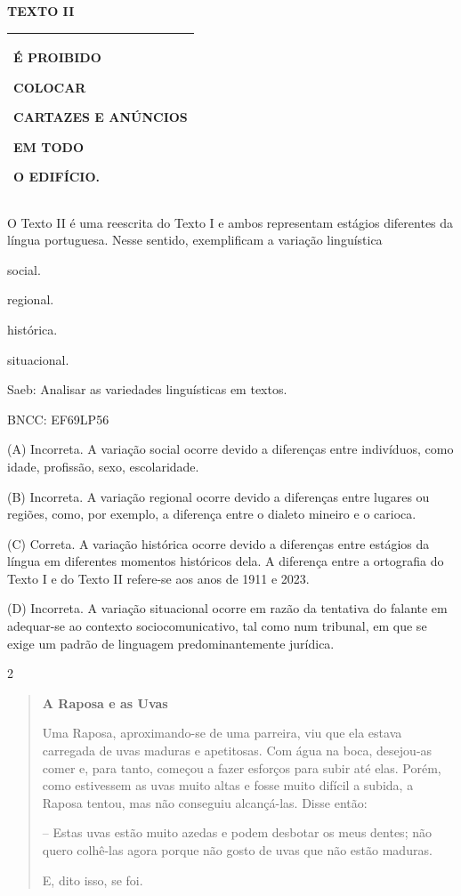 
\textbf{TEXTO II}

\begin{longtable}[]{@{}l@{}}
\toprule
\endhead
\begin{minipage}[t]{0.30\columnwidth}\raggedright
É PROIBIDO

COLOCAR

CARTAZES E ANÚNCIOS

EM TODO

O EDIFÍCIO.\strut
\end{minipage}\tabularnewline
\bottomrule
\end{longtable}


O Texto II é uma reescrita do Texto I e ambos representam estágios
diferentes da língua portuguesa. Nesse sentido, exemplificam a variação
linguística

\begin{escolha}
\item
  social.
\item
  regional.
\item
  histórica.
\item
  situacional.
\end{escolha}

Saeb: Analisar as variedades linguísticas em textos.

BNCC: EF69LP56

(A) Incorreta. A variação social ocorre devido a diferenças entre
indivíduos, como idade, profissão, sexo, escolaridade.

(B) Incorreta. A variação regional ocorre devido a diferenças entre
lugares ou regiões, como, por exemplo, a diferença entre o dialeto
mineiro e o carioca.

(C) Correta. A variação histórica ocorre devido a diferenças entre
estágios da língua em diferentes momentos históricos dela. A diferença
entre a ortografia do Texto I e do Texto II refere-se aos anos de 1911 e
2023.

(D) Incorreta. A variação situacional ocorre em razão da tentativa do
falante em adequar-se ao contexto sociocomunicativo, tal como num
tribunal, em que se exige um padrão de linguagem predominantemente
jurídica.

\num{2}

\begin{quote}
\textbf{A Raposa e as Uvas}

Uma Raposa, aproximando-se de uma parreira, viu que ela estava carregada
de uvas maduras e apetitosas. Com água na boca, desejou-as comer e, para
tanto, começou a fazer esforços para subir até elas. Porém, como
estivessem as uvas muito altas e fosse muito difícil a subida, a Raposa
tentou, mas não conseguiu alcançá-las. Disse então:

-- Estas uvas estão muito azedas e podem desbotar os meus dentes; não
quero colhê-las agora porque não gosto de uvas que não estão maduras.

E, dito isso, se foi.
\end{quote}

